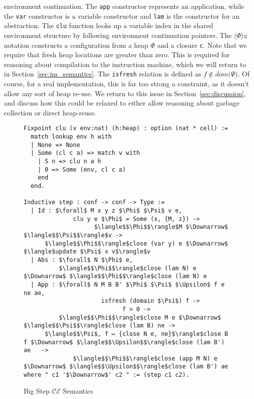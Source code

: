 environment continuation. The \texttt{app} constructor represents an
application, while the \texttt{var} constructor is a variable constructor and
\texttt{lam} is the constructor for an abstraction. The \texttt{clu} function
looks up a variable index in the shared environment structure by following
environment continuation pointers. The $\langle \Phi \rangle \texttt{c}$
notation constructs a configuration from a heap $\Phi$ and a closure \texttt{c}.
Note that we require that fresh heap locations are greater than zero. This is
required for reasoning about compilation to the instruction machine, which we
will return to in Section~\ref{sec:im_semantics}. The \texttt{isfresh} relation
is defined as $f \notin dom \big( \Psi \big)$. Of course, for a real
implementation, this is far too strong a constraint, as it doesn't allow any
sort of heap re-use. We return to this issue in Section~\ref{sec:discussion},
and discuss how this could be relaxed to either allow reasoning about garbage
collection or direct heap-reuse.

\begin{figure}
\begin{lstlisting}
Fixpoint clu (v env:nat) (h:heap) : option (nat * cell) := 
  match lookup env h with
  | None => None
  | Some (cl c a) => match v with
    | S n => clu n a h
    | 0 => Some (env, cl c a)
    end
  end.

Inductive step : conf -> conf -> Type :=
  | Id : $\forall$ M x y z $\Phi$ $\Psi$ v e, 
              clu y e $\Phi$ = Some (x, {M, z}) -> 
                    $\langle$$\Phi$$\rangle$M $\Downarrow$ $\langle$$\Psi$$\rangle$v ->
      $\langle$$\Phi$$\rangle$close (var y) e $\Downarrow$ $\langle$update $\Psi$ x v$\rangle$v
  | Abs : $\forall$ N $\Phi$ e, 
          $\langle$$\Phi$$\rangle$close (lam N) e $\Downarrow$ $\langle$$\Phi$$\rangle$close (lam N) e
  | App : $\forall$ N M B B' $\Phi$ $\Psi$ $\Upsilon$ f e ne ae, 
                      isfresh (domain $\Psi$) f -> 
                            f > 0 ->
          $\langle$$\Phi$$\rangle$close M e $\Downarrow$ $\langle$$\Psi$$\rangle$close (lam B) ne -> 
      $\langle$$\Psi$, f ↦ {close N e, ne}$\rangle$close B f $\Downarrow$ $\langle$$\Upsilon$$\rangle$close (lam B') ae   ->
              $\langle$$\Phi$$\rangle$close (app M N) e $\Downarrow$ $\langle$$\Upsilon$$\rangle$close (lam B') ae
where " c1 '$\Downarrow$' c2 " := (step c1 c2).
\end{lstlisting}
\caption{Big Step $\mathcal{CE}$ Semantics}
\label{fig:bigstep}
\end{figure}

